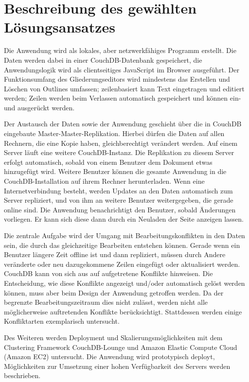 \section{Beschreibung des gewählten Lösungsansatzes}

Die Anwendung wird als lokales, aber netzwerkfähiges Programm erstellt. Die Daten werden dabei in einer CouchDB-Datenbank gespeichert, die Anwendungslogik wird als clientseitiges JavaScript im Browser ausgeführt. Der Funktionsumfang des Gliederungseditors wird mindestens das Erstellen und Löschen von Outlines umfassen; zeilenbasiert kann Text eingetragen und editiert werden; Zeilen werden beim Verlassen automatisch gespeichert und können ein- und ausgerückt werden. 

Der Austausch der Daten sowie der Anwendung geschieht über die in CouchDB eingebaute Master-Master-Replikation. Hierbei dürfen die Daten auf allen Rechnern, die eine Kopie haben, gleichberechtigt verändert werden. Auf einem Server läuft eine weitere CouchDB-Instanz. Die Replikation zu diesem Server erfolgt automatisch, sobald von einem Benutzer dem Dokument etwas hinzugefügt wird. Weitere Benutzer können die gesamte Anwendung in die CouchDB-Installation auf ihrem Rechner herunterladen. Wenn eine Internetverbindung besteht, werden Updates an den Daten automatisch zum Server repliziert, und von ihm an weitere Benutzer weitergegeben, die gerade online sind. Die Anwendung benachrichtigt den Benutzer, sobald Änderungen vorliegen. Er kann sich diese dann durch ein Neuladen der Seite anzeigen lassen. 

Die zentrale Aufgabe wird der Umgang mit Bearbeitungskonflikten in den Daten sein, die durch das gleichzeitige Bearbeiten entstehen können. Gerade wenn ein Benutzer längere Zeit offline ist und dann repliziert, müssen durch Andere veränderte oder neu dazugekommene Zeilen eingefügt oder aktualisiert werden. CouchDB kann von sich aus auf aufgetretene Konflikte hinweisen. Die Entscheidung, wie diese Konflikte angezeigt und/oder automatisch gelöst werden können, muss aber beim Design der Anwendung getroffen werden. Da der begrenzte Bearbeitungszeitraum dies nicht zulässt, werden nicht alle möglicherweise auftretenden Konflikte berücksichtigt. Stattdessen werden einige Konfliktarten exemplarisch untersucht.

Des Weiteren werden Deployment und Skalierungsmöglichkeiten mit dem Clustering Framework CouchDB-Lounge und Amazon Elastic Compute Cloud (Amazon EC2) untersucht. Die Anwendung wird prototypisch deployt, Möglichkeiten zur Umsetzung einer hohen Verfügbarkeit des Servers werden beschrieben.
